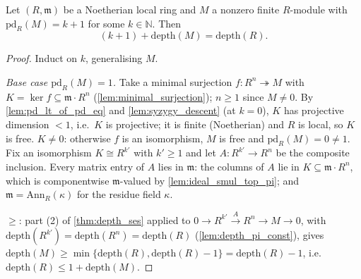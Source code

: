 \begin{theorem}
  \label{thm:auslander_buchsbaum_succ}
  \leanok
  Let \((R, \mathfrak m)\) be a Noetherian local ring and \(M\) a nonzero finite
  \(R\)-module with \(\mathrm{pd}_R(M) = k + 1\) for some \(k \in \mathbb{N}\). Then
  \[
    (k + 1) + \mathrm{depth}(M) = \mathrm{depth}(R).
  \]
\end{theorem}
\begin{proof}
  \leanok
  Induct on \(k\), generalising \(M\).

  \emph{Base case \(\mathrm{pd}_R(M) = 1\).} Take a minimal surjection
  \(f : R^n \twoheadrightarrow M\) with \(K = \ker f \subseteq \mathfrak m \cdot R^n\)
  (\ref{lem:minimal_surjection}); \(n \geq 1\) since \(M \neq 0\). By
  \ref{lem:pd_lt_of_pd_eq} and \ref{lem:syzygy_descent} (at \(k = 0\)), \(K\) has
  projective dimension \(< 1\), i.e.\ \(K\) is projective; it is finite (Noetherian) and
  \(R\) is local, so \(K\) is free. \(K \neq 0\): otherwise \(f\) is an isomorphism,
  \(M\) is free and \(\mathrm{pd}_R(M) = 0 \neq 1\). Fix an isomorphism
  \(K \cong R^{k'}\) with \(k' \geq 1\) and let \(A : R^{k'} \to R^n\) be the composite
  inclusion. Every matrix entry of \(A\) lies in \(\mathfrak m\): the columns of \(A\)
  lie in \(K \subseteq \mathfrak m \cdot R^n\), which is componentwise
  \(\mathfrak m\)-valued by \ref{lem:ideal_smul_top_pi}; and
  \(\mathfrak m = \mathrm{Ann}_R(\kappa)\) for the residue field \(\kappa\).

  \(\geq\): part (2) of \ref{thm:depth_ses} applied to
  \(0 \to R^{k'} \xrightarrow{A} R^n \to M \to 0\), with
  \(\mathrm{depth}(R^{k'}) = \mathrm{depth}(R^n) = \mathrm{depth}(R)\)
  (\ref{lem:depth_pi_const}), gives
  \(\mathrm{depth}(M) \geq \min\{\mathrm{depth}(R), \mathrm{depth}(R) - 1\}
  = \mathrm{depth}(R) - 1\), i.e.\
  \(\mathrm{depth}(R) \leq 1 + \mathrm{depth}(M)\).


\end{proof}

